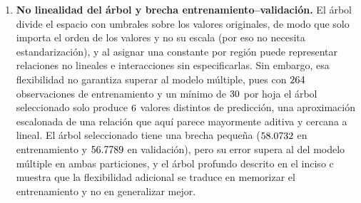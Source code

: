 \begin{enumerate}
\begin{table}[H]
\centering
\resizebox{\textwidth}{!}{}
\caption{Candidatos de regresión y referencia constante (entrenamiento y validación).}
\label{tab:ex7-candidatos}
\end{table}

El candidato final de regresión es la \textbf{regresión múltiple}, con el
menor RMSE de validación ($\CandidatoRegRMSEVal$), por delante del árbol
seleccionado ($\ArbolRegRMSEVal$) y del modelo simple ($\RegSimpleRMSEVal$),
sin necesidad de aplicar la regla de desempate; la constante
($\RegDummyRMSEVal$) queda como referencia. La decisión se congeló antes de
consultar la prueba.

\item \textbf{No linealidad del árbol y brecha entrenamiento--validación.}
El árbol divide el espacio con umbrales sobre los valores originales, de
modo que solo importa el orden de los valores y no su escala (por eso no
necesita estandarización), y al asignar una constante por región puede
representar relaciones no lineales e interacciones sin especificarlas. Sin
embargo, esa flexibilidad no garantiza superar al modelo múltiple, pues con
$264$ observaciones de entrenamiento y un mínimo de $30$
por hoja el árbol seleccionado solo produce $6$ valores
distintos de predicción, una aproximación escalonada de una relación que
aquí parece mayormente aditiva y cercana a lineal. El árbol seleccionado
tiene una brecha pequeña ($58.0732$ en entrenamiento y
$\ArbolRegRMSEVal$ en validación), pero su error supera al del modelo múltiple
en ambas particiones, y el árbol profundo descrito en el inciso c muestra que
la flexibilidad adicional se traduce en memorizar el entrenamiento y no en
generalizar mejor.

\end{enumerate}
